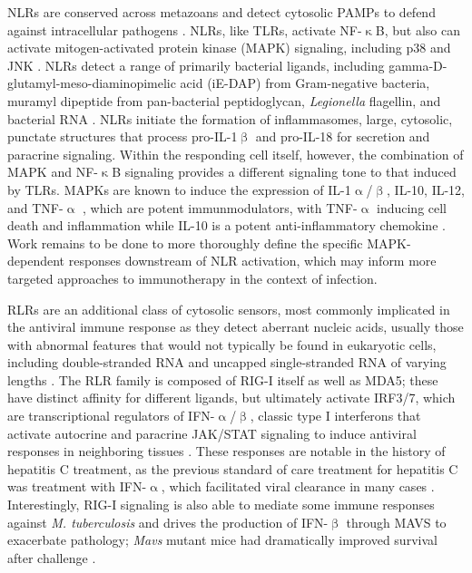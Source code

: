 NLRs are conserved across metazoans and detect cytosolic PAMPs to defend against intracellular pathogens \citep{Creagh2006, Clarke2014, Motta2015, Martinon2005}. NLRs, like TLRs, activate NF\hyp{}$\upkappa$B, but also can activate mitogen\hyp{}activated protein kinase (MAPK) signaling, including p38 and JNK \citep{Shaw2008, Franchi2009, Saxena2014, Platnich2019, Zhong2013, Velloso2019}. NLRs detect a range of primarily bacterial ligands, including gamma\hyp{}D\hyp{}glutamyl\hyp{}meso\hyp{}diaminopimelic acid (iE\hyp{}DAP) from Gram\hyp{}negative bacteria, muramyl dipeptide from pan\hyp{}bacterial peptidoglycan, \textit{Legionella} flagellin, and bacterial RNA \citep{Saxena2014, Franchi2009, Zhong2013}. NLRs initiate the formation of inflammasomes, large, cytosolic, punctate structures that process pro\hyp{}IL\hyp{}1$\upbeta$ and pro\hyp{}IL\hyp{}18 for secretion and paracrine signaling. Within the responding cell itself, however, the combination of MAPK and NF\hyp{}$\upkappa$B signaling provides a different signaling tone to that induced by TLRs. MAPKs are known to induce the expression of IL\hyp{}1$\upalpha$/$\upbeta$, IL\hyp{}10, IL\hyp{}12, and TNF\hyp{}$\upalpha$ \citep{Dong2002, Arthur2013, SoaresSilva2016}, which are potent immunmodulators, with TNF\hyp{}$\upalpha$ inducing cell death and inflammation while IL\hyp{}10 is a potent anti\hyp{}inflammatory chemokine \citep{SoaresSilva2016, Couper2008, Ouyang2011}. Work remains to be done to more thoroughly define the specific MAPK\hyp{}dependent responses downstream of NLR activation, which may inform more targeted approaches to immunotherapy in the context of infection.

RLRs are an additional class of cytosolic sensors, most commonly implicated in the antiviral immune response as they detect aberrant nucleic acids, usually those with abnormal features that would not typically be found in eukaryotic cells, including double\hyp{}stranded RNA and uncapped single\hyp{}stranded RNA of varying lengths \citep{Loo2011, Jia2021, Rehwinkel2020, Kawai2010}. The RLR family is composed of RIG\hyp{}I itself as well as MDA5; these have distinct affinity for different ligands, but ultimately activate IRF3/7, which are transcriptional regulators of IFN\hyp{}$\upalpha$/$\upbeta$, classic type I interferons that activate autocrine and paracrine JAK/STAT signaling to induce antiviral responses in neighboring tissues \citep{Loo2011}. These responses are notable in the history of hepatitis C treatment, as the previous standard of care treatment for hepatitis C was treatment with IFN\hyp{}$\upalpha$, which facilitated viral clearance in many cases \citep{Rong2010}. Interestingly, RIG\hyp{}I signaling is also able to mediate some immune responses against \textit{M. tuberculosis} and drives the production of IFN\hyp{}$\upbeta$ through MAVS to exacerbate pathology; \textit{Mavs} mutant mice had dramatically improved survival after challenge \citep{Cheng2018}.


